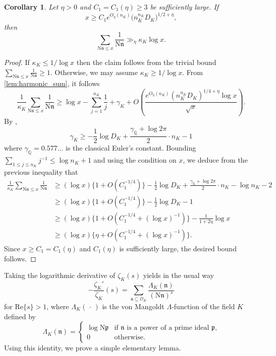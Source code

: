 \documentclass[12pt,psamsfonts]{amsart}
\newtheorem{cor}[thm]{Corollary}
\theoremstyle{definition}
\theoremstyle{remark}
\numberwithin{equation}{section}
\theoremstyle{plain}
\theoremstyle{remark}
\renewcommand{\1}{ {\bf 1}}
\newcommand{\kn}{\mathfrak{n}}
\newcommand{\N}{\mathrm{N}}
\newcommand{\kp}{\mathfrak{p}}
\newcommand{\cO}{\mathcal{O}}
\newcommand{\Q}{\mathbb{Q}}
\renewcommand{\Re}{\mathrm{Re}}
\begin{document}
\begin{cor}
\label{cor:harmonic_sum}
Let $\eta > 0$ and $C_1 = C_1(\eta) \geq 3$ be sufficiently large. If
\[
x \geq C_1 e^{O_{\eta}(n_K)}  \big( n_K^{n_K} D_K)^{1/2+\eta},
\]
then
\[
\sum_{\mathrm{N}\kn \leq x} \frac{1}{\mathrm{N}\kn} \gg_{\eta} \kappa_K \log x.
\]
\end{cor}
\begin{proof} If $\kappa_K \leq 1/\log x$ then the claim follows from the trivial bound $\sum_{\mathrm{N}\kn \leq x} \frac{1}{\mathrm{N}\kn} \geq 1$. Otherwise, we may assume $\kappa_K \geq 1/\log x$. From \cref{lem:harmonic_sum}, it follows
\[
\frac{1}{\kappa_K} \sum_{\mathrm{N}\kn \leq x} \frac{1}{\mathrm{N}\kn} \geq  \log x - \sum_{j=1}^{n_K} \frac{1}{j} + \gamma_K + O\left( \frac{ e^{O_{\eta}(n_K)} (n_K^{n_K} D_K)^{1/4+\eta}  \log x}{\sqrt{x}} \right).
\]
By \cite[Proposition 3]{Ihara} ,
\[
\gamma_K \geq - \frac{1}{2} \log D_K  + \frac{\gamma_{\Q} + \log 2\pi}{2} \cdot n_K - 1
\]
where $\gamma_{\Q} = 0.577\dots$ is the classical Euler's constant. 
Bounding $\sum_{1 \leq j \leq n_K} j^{-1} \leq \log n_K + 1$ and using the condition on $x$, we deduce from the previous inequality that 
\begin{align*}
\frac{1}{\kappa_K} \sum_{\mathrm{N}\kn \leq x} \frac{1}{\mathrm{N}\kn} 
& \geq (\log x) \{ 1 + O( C_1^{-1/4} ) \} - \frac{1}{2}\log D_K + \frac{\gamma_{\Q} + \log 2\pi}{2} \cdot n_K - \log n_K - 2  \\
& \geq (\log x) \{ 1 + O( C_1^{-1/4} ) \} - \frac{1}{2}\log D_K  - 1 \\
& \geq (\log x) \{ 1 + O( C_1^{-1/4} + (\log x)^{-1} ) \} - \frac{1}{1+2\eta}\log x  \\
& \geq (\log x) \{ \eta + O(C_1^{-1/4} + (\log x)^{-1} ) \}. 
\end{align*}
Since $x \geq C_1 = C_1(\eta)$ and $C_1(\eta)$ is sufficiently large, the desired bound follows. 
\end{proof}

Taking the logarithmic derivative of $\zeta_K(s)$ yields in the usual way
\begin{equation}
-\frac{\zeta_K'}{\zeta_K}(s) = \sum_{\kn \subseteq \cO_K} \frac{\Lambda_K(\kn)}{(\N\kn)^s}
\label{eqn:LogDiffZeta}
\end{equation}
for $\Re\{s\}>1$, where $\Lambda_K( \, \cdot \,)$ is the von Mangoldt $\Lambda$-function of the field $K$ defined by
\begin{equation}
\Lambda_K(\kn) = 
	\begin{cases}
		\log \N\kp & \text{if $\kn$ is a power of a prime ideal $\kp$,} \\
		0 & \text{otherwise.}
	\end{cases}
	\label{def:vonMangoldt}
\end{equation}
Using this identity, we prove a simple elementary lemma.
\end{document}
